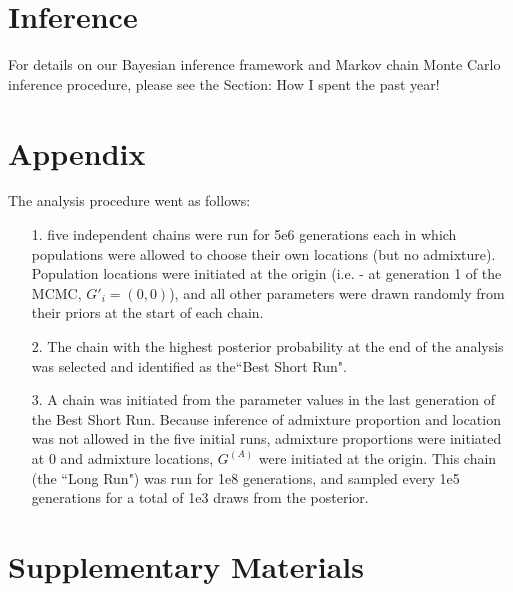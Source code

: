 \documentclass[12pt]{article}
\newcommand{\admixsource}[1]{{$G^{(A)}$}}
\begin{document}
\section*{Inference}
For details on our Bayesian inference framework and Markov chain Monte Carlo inference procedure, please see the Section: How I spent the past year!



\section*{Appendix}

The analysis procedure went as follows: 
\begin{itemize}
\item[1.] five independent chains were run for 5e6 generations each in which populations were allowed to choose their own locations (but no admixture).  Population locations were initiated at the origin (i.e. - at generation 1 of the MCMC, $G'_i = (0,0)$), and all other parameters were drawn randomly from their priors at the start of each chain.  
%
\item[2.]The chain with the highest posterior probability at the end of the analysis was selected and identified as the``Best Short Run".
%
\item[3.] A chain was initiated from the parameter values in the last generation of the Best Short Run.  Because inference of admixture proportion and location was not allowed in the five initial runs, admixture proportions were initiated at 0 and admixture locations, \admixsource{G} were initiated at the origin.  This  chain (the ``Long Run") was run for 1e8 generations, and sampled every 1e5 generations for a total of 1e3 draws from the posterior.
\end{itemize}

\newpage


\section*{Supplementary Materials}
\end{document}
